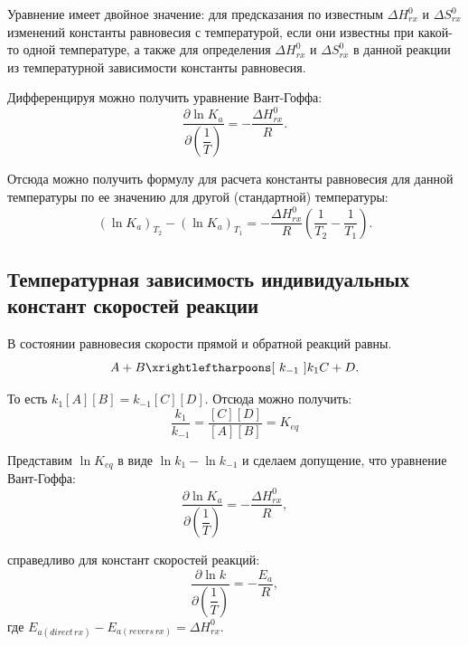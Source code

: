 \documentclass[12pt,a4paper,oneside]{book}
\begin{document}
Уравнение имеет двойное значение: для предсказания по известным $\Delta H_{rx}^0$ и $\Delta S_{rx}^0$ изменений константы равновесия с температурой, если они известны при какой-то одной температуре, а также для определения $\Delta H_{rx}^0$ и $\Delta S_{rx}^0$ в данной реакции из температурной зависимости константы равновесия.

Дифференцируя можно получить уравнение Вант-Гоффа:
\begin{equation}
  \frac{\partial \ln K_a}{\partial \left(\dfrac {1}{T} \right)} =  - \frac{\Delta H_{rx}^0}{R}.
\end{equation} 

Отсюда можно получить формулу для расчета константы равновесия для данной температуры по ее значению для другой (стандартной) температуры:
\begin{equation}
  (\ln K_a)_{T_2} - (\ln K_a)_{T_1} =  - \frac{\Delta H_{rx}^0}{R}\left(\frac{1}{T_2} - \frac{1}{T_1} \right) .
\end{equation} 


\subsection{Температурная зависимость индивидуальных констант скоростей реакции}

В состоянии равновесия скорости прямой и обратной реакций равны.
\begin{equation}
A + B \xrightleftharpoons[~k_{-1}~]{k_1} C + D.
\end{equation}

То есть $ k_1 [A] [B] = k_{-1} [C] [D] $. Отсюда можно получить:
\begin{equation}
\dfrac{k_1}{k_{-1}} = \dfrac{[C][D]}{[A] [B]} = K_{eq}
\end{equation}

Представим $ \ln K_{eq} $ в виде $ \ln k_1 - \ln k_{-1} $ и сделаем допущение, что уравнение Вант-Гоффа:
\begin{equation}
  \frac{\partial \ln K_a}{\partial \left(\dfrac {1}{T} \right)} =  - \frac{\Delta H_{rx}^0}{R},
\end{equation} 

справедливо для констант скоростей реакций:
\begin{equation}
  \frac{\partial \ln k}{\partial \left(\dfrac {1}{T} \right)} =  - \frac{E_a}{R},
\end{equation} 
где $ E_{a (direct \, rx)} - E_{a (revers \, rx)} = \Delta H_{rx}^0 $.
\end{document}
